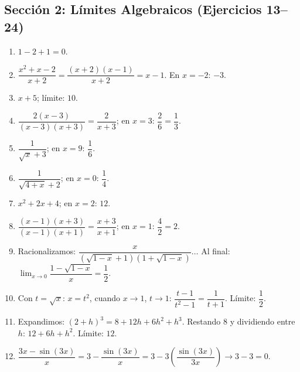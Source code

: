 \documentclass[12pt, letterpaper]{article}
\begin{document}
  \subsection*{Sección 2: Límites Algebraicos (Ejercicios 13--24)}

  \begin{enumerate}[resume=respuestas, leftmargin=*, label=\textbf{\arabic*.}]
    \item $1 - 2 + 1 = 0$.

    \item $\dfrac{x^2 + x - 2}{x + 2} = \dfrac{(x + 2)(x - 1)}{x + 2} = x - 1$. En $x = -2$: $-3$.

    \item $x + 5$; límite: $10$.

    \item $\dfrac{2(x - 3)}{(x - 3)(x + 3)} = \dfrac{2}{x + 3}$; en $x = 3$: $\dfrac{2}{6} = \dfrac{1}{3}$.

    \item $\dfrac{1}{\sqrt{x} + 3}$; en $x = 9$: $\dfrac{1}{6}$.

    \item $\dfrac{1}{\sqrt{4 + x} + 2}$; en $x = 0$: $\dfrac{1}{4}$.

    \item $x^2 + 2x + 4$; en $x = 2$: $12$.

    \item $\dfrac{(x - 1)(x + 3)}{(x - 1)(x + 1)} = \dfrac{x + 3}{x + 1}$; en $x = 1$: $\dfrac{4}{2} = 2$.

    \item Racionalizamos: $\dfrac{x}{(\sqrt{1 - x} + 1)(1 + \sqrt{1-x})} \dots$ Al final: $\lim_{x \to 0} \dfrac{1 - \sqrt{1 - x}}{x} = \dfrac{1}{2}$.

    \item Con $t = \sqrt{x}$: $x = t^2$, cuando $x \to 1$, $t \to 1$: $\dfrac{t - 1}{t^2 - 1} = \dfrac{1}{t + 1}$. Límite: $\dfrac{1}{2}$.

    \item Expandimos: $(2 + h)^3 = 8 + 12h + 6h^2 + h^3$. Restando 8 y dividiendo entre $h$: $12 + 6h + h^2$. Límite: $12$.

    \item $\dfrac{3x - \sin(3x)}{x} = 3 - \dfrac{\sin(3x)}{x} = 3 - 3\left(\dfrac{\sin(3x)}{3x}\right) \to 3 - 3 = 0$.
  \end{enumerate}


\end{document}
